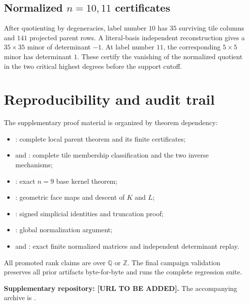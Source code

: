 \documentclass[11pt]{article}
\newcommand{\1}{\mathbf 1}
\begin{document}
\subsection{Normalized \texorpdfstring{$n=10,11$}{n=10,11} certificates}
After quotienting by degeneracies, label number $10$ has $35$ surviving
tile columns and $141$ projected parent rows.  A literal-basis independent
reconstruction gives a $35\times35$ minor of determinant $-1$.  At label
number $11$, the corresponding $5\times5$ minor has determinant $1$.
These certify the vanishing of the normalized quotient in the two critical
highest degrees before the support cutoff.

\section{Reproducibility and audit trail}\label{app:repro}

The supplementary proof material is organized by theorem dependency:
\begin{itemize}
\item {}: complete local
parent theorem and its finite certificates;
\item {} and
: complete tile membership
classification and the two inverse mechanisms;
\item {}: exact $n=9$ base
kernel theorem;
\item {}: geometric face
maps and descent of $K$ and $L$;
\item {}: signed
simplicial identities and truncation proof;
\item {}: global normalization
argument;
\item {} and
: exact finite
normalized matrices and independent determinant replay.
\end{itemize}
All promoted rank claims are over $\mathbb Q$ or $\mathbb Z$.  The final
campaign validation preserves all prior artifacts byte-for-byte and runs
the complete regression suite.

\noindent\textbf{Supplementary repository: [URL TO BE ADDED].}
The accompanying archive is .
\end{document}
